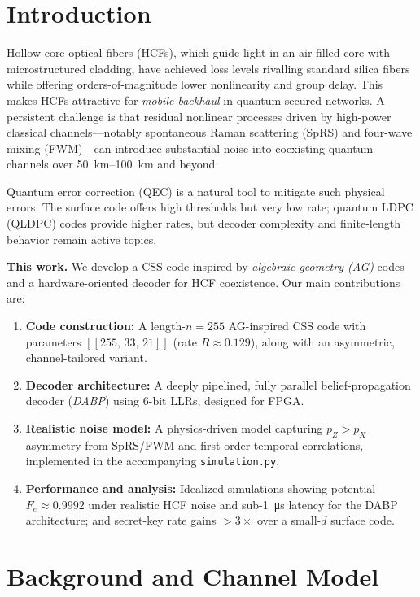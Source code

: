\section{Introduction}
Hollow-core optical fibers (HCFs), which guide light in an air-filled core with microstructured cladding, have achieved loss levels rivalling standard silica fibers while offering orders-of-magnitude lower nonlinearity and group delay. This makes HCFs attractive for \emph{mobile backhaul} in quantum-secured networks. A persistent challenge is that residual nonlinear processes driven by high-power classical channels---notably spontaneous Raman scattering (SpRS) and four-wave mixing (FWM)---can introduce substantial noise into coexisting quantum channels over \SIrange{50}{100}{\kilo\meter} and beyond.

Quantum error correction (QEC) is a natural tool to mitigate such physical errors. The surface code offers high thresholds but very low rate; quantum LDPC (QLDPC) codes provide higher rates, but decoder complexity and finite-length behavior remain active topics.

\textbf{This work.} We develop a CSS code inspired by \emph{algebraic-geometry (AG)} codes and a hardware-oriented decoder for HCF coexistence. Our main contributions are:
\begin{enumerate}[leftmargin=*,itemsep=1pt,topsep=2pt]
  \item \textbf{Code construction:} A length-\(n=255\) AG-inspired CSS code with parameters \( [[255,\,33,\,21]] \) (rate \(R\approx0.129\)), along with an asymmetric, channel-tailored variant.
  \item \textbf{Decoder architecture:} A deeply pipelined, fully parallel belief-propagation decoder (\emph{DABP}) using 6-bit LLRs, designed for FPGA.
  \item \textbf{Realistic noise model:} A physics-driven model capturing \(p_Z\!>\!p_X\) asymmetry from SpRS/FWM and first-order temporal correlations, implemented in the accompanying \texttt{simulation.py}.
  \item \textbf{Performance and analysis:} Idealized simulations showing potential \(F_e\approx0.9992\) under realistic HCF noise and sub-\SI{1}{\micro\second} latency for the DABP architecture; and secret-key rate gains \(>\!3\times\) over a small-\(d\) surface code.
\end{enumerate}

\section{Background and Channel Model}\label{sec:background}

